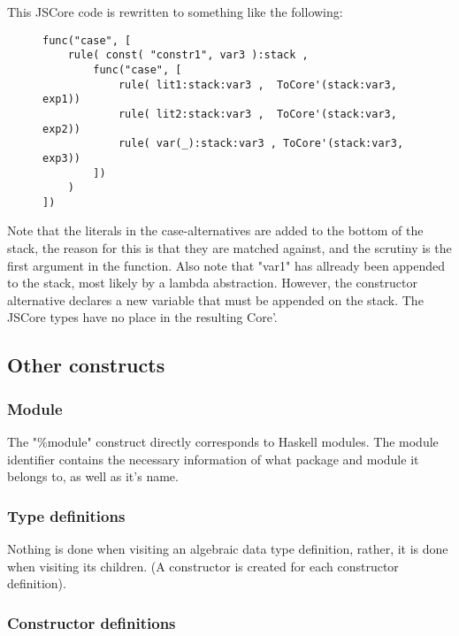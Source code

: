 This JSCore code is rewritten to something like the following:

\begin{figure}[H]
\lstset{ %
language=Haskell,
caption=JSCore case expression in Core',
label=lst:int1
}
\begin{lstlisting}
func("case", [
    rule( const( "constr1", var3 ):stack ,
        func("case", [  
            rule( lit1:stack:var3 ,  ToCore'(stack:var3, exp1))
            rule( lit2:stack:var3 ,  ToCore'(stack:var3, exp2))
            rule( var(_):stack:var3 , ToCore'(stack:var3, exp3))
        ])
    )
])
\end{lstlisting}
\end{figure}

Note that the literals in the case-alternatives are added to the bottom of the stack,
the reason for this is that they are matched against, and the scrutiny is the first
argument in the function.
Also note that "var1" has allready
been appended to the stack, most likely by a lambda abstraction. However, 
the constructor
alternative declares a new variable that must be appended on the stack.
The JSCore types have no place in the resulting Core'.

\subsection*{Other constructs}

\subsubsection*{Module}

The "\%module" construct directly corresponds to Haskell modules. The module identifier
contains the necessary information of what package and module it belongs to, as
well as it's name.

\subsubsection*{Type definitions}

Nothing is done when visiting an algebraic data type definition, rather, it is done when 
visiting its children. (A constructor is created for each constructor definition).

\subsubsection*{Constructor definitions}

